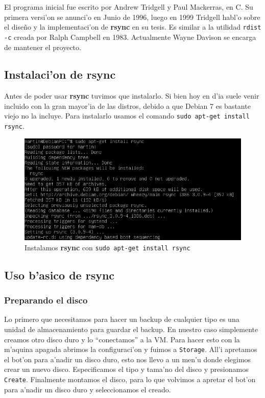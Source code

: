 \documentclass[11pt]{article}
\newcommand{\rsync}[0]{\textbf{rsync}}
\begin{document}
		El programa inicial fue escrito por Andrew Tridgell y Paul Mackerras, en C. Su primera versi'on se anunci'o en Junio de 1996, luego en 1999 Tridgell habl'o sobre el diseño y la implementaci'on de \rsync{} en su tesis. Es similar a la utilidad \texttt{rdist -c} creada por Ralph Campbell en 1983. Actualmente Wayne Davison se encarga de mantener el proyecto.

	\subsection{Instalaci'on de rsync}
		Antes de poder usar \rsync{} tuvimos que instalarlo. Si bien hoy en d'ia suele venir incluido con la gran mayor'ia de las distros, debido a que Debian 7 es bastante viejo no la incluye. Para instalarlo usamos el comando \texttt{sudo apt-get install rsync}.

		\begin{figure}[H]
    			\centering \captionsetup{justification=centering}
    			\includegraphics[scale=0.7]{Images/rsync/rsync_install.PNG}
    			\caption{Instalamos \rsync{} con \texttt{sudo apt-get install rsync}}
    			\label{fig:rsync_install}
		\end{figure}

	\subsection{Uso b'asico de rsync}
	\subsubsection{Preparando el disco}
		Lo primero que necesitamos para hacer un backup de cualquier tipo es una unidad de almacenamiento para guardar el backup. En nuestro caso simplemente creamos otro disco duro y lo ``conectamos'' a la VM. Para hacer esto con la m'aquina apagada abrimos la configuraci'on y fuimos a \texttt{Storage}. All'i apretamos el bot'on para a'nadir un disco duro, esto nos llevo a un men'u donde elegimos crear un nuevo disco. Especificamos el tipo y tama'no del disco y presionamos \texttt{Create}. Finalmente montamos el disco, para lo que volvimos a apretar el bot'on para a'nadir un disco duro y seleccionamos el creado.
\end{document}
